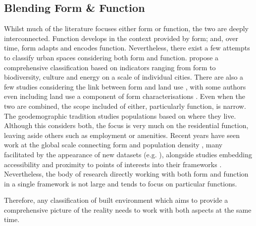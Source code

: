 \subsection{Blending Form \& Function}
\label{sec:lit_gaps}

Whilst much of the literature focuses either form or function, the two
are deeply interconnected. Function develops in the context provided by
form; and, over time, form adapts and encodes function.
%
Nevertheless, there exist a few attempts to classify urban spaces considering
both form and function. \cite{bourdic2012} propose a comprehensive
classification based on indicators ranging from form to biodiversity, culture and energy on a scale of individual cities.
%
There are also a few studies considering the link between form and land use
\citep{song2007,song2013,bourdic2012}, with some authors even including land
use a component of form characterisations \citep{dibble2019origin}.
Even when the two are combined, the scope included of either, particularly
function, is narrow.
%
The geodemographic tradition
\citep{harris2005,webber2018} studies populations based on where they live.
Although this considers both, the focus is very much on the residential
function, leaving aside others such as employment or amenities.
%
Recent years have seen work at the global scale connecting form and population
density \citep{ewing2002measuring,zheng2014urban,oecd2018rethinking}, many
facilitated by the appearance of new datasets (e.g.
\citealp{pesaresi2019ghs,sorichetta2015}), alongside studies embedding
accessibility and proximity to points of interests into their frameworks
\citep{alexiou2016a,venerandi2019machine}.
%
Nevertheless, the
body of research directly working with both form and function in a single
framework is not large and tends to focus on particular functions.


Therefore, any classification of
built environment which aims to provide a comprehensive picture of the reality
needs to work with both aspects at the same time. 


